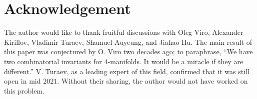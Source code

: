 \section*{Acknowledgement}

The author would like to thank fruitful discussions with Oleg
Viro, Alexander Kirillov, Vladimir Turaev, Shamuel Auyeung, and
Jiahao Hu. The main result of this paper was conjectured by O.
Viro two decades ago; to paraphrase, ``We have two combinatorial
invariants for 4-manifolds. It would be a miracle if they are
different.'' V. Turaev, as a leading expert of this field,
confirmed that it was still open in mid $2021$. Without their
sharing, the author would not have worked on this problem.

